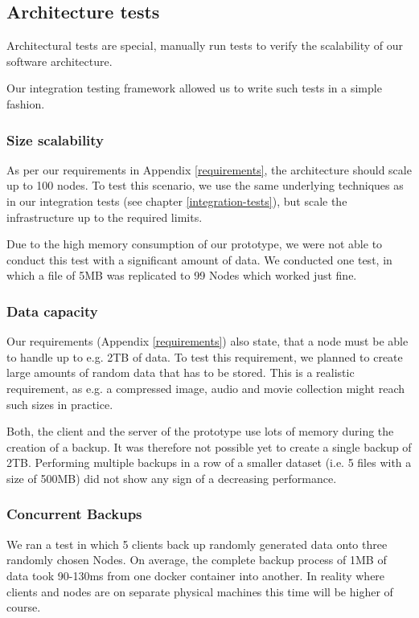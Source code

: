 \subsection{Architecture tests}

Architectural tests are special, manually run tests to verify the scalability of our software architecture.

Our integration testing framework allowed us to write such tests in a simple fashion.

\subsubsection{Size scalability}
As per our requirements in Appendix \ref{requirements}, the architecture should scale up to 100 nodes. To test this scenario, we use the same underlying techniques as in our integration tests (see chapter \ref{integration-tests}), but scale the infrastructure up to the required limits.

Due to the high memory consumption of our prototype, we were not able to conduct this test with a significant amount of data. We conducted one test, in which a file of 5MB was replicated to 99 Nodes which worked just fine.

\subsubsection{Data capacity}
Our requirements (Appendix \ref{requirements}) also state, that a node must be able to handle up to e.g. 2TB of data. To test this requirement, we planned to create large amounts of random data that has to be stored. This is a realistic requirement, as e.g. a compressed image, audio and movie collection might reach such sizes in practice.

Both, the client and the server of the prototype use lots of memory during the creation of a backup. It was therefore not possible yet to create a single backup of 2TB. Performing multiple backups in a row of a smaller dataset (i.e. 5 files with a size of 500MB) did not show any sign of a decreasing performance.

\subsubsection{Concurrent Backups}

We ran a test in which 5 clients back up randomly generated data onto three randomly chosen Nodes. On average, the complete backup process of 1MB of data took 90-130ms from one docker container into another. In reality where clients and nodes are on separate physical machines this time will be higher of course.

